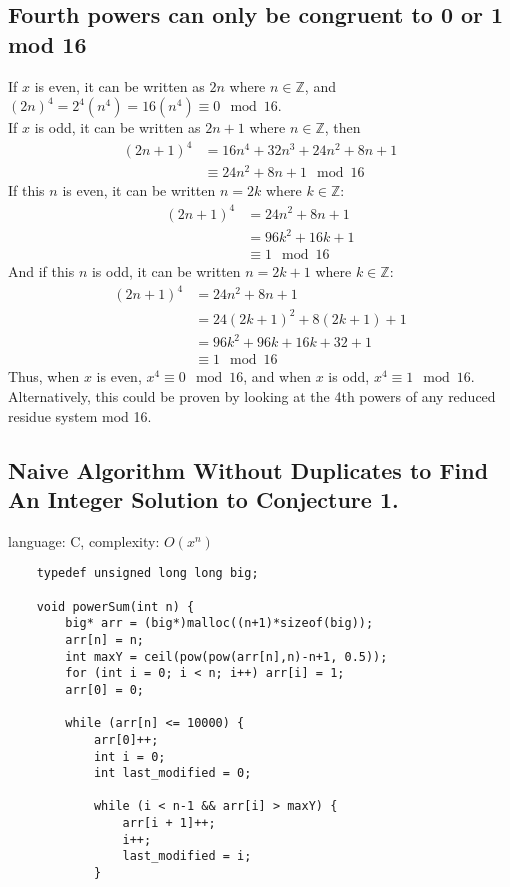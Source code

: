 \documentclass{article}
\begin{document}
\begin{flushleft}
\subsection{Fourth powers can only be congruent to 0 or 1 mod 16}
If $x$ is even, it can be written as $2n$ where $n \in \mathbb{Z}$, and $(2n)^4=2^4(n^4)=16(n^4) \equiv 0 \mod 16$. \\
If $x$ is odd, it can be written as $2n+1$ where $n \in \mathbb{Z}$, then 
\begin{align*}
    (2n+1)^4 &= 16n^4 + 32n^3 + 24n^2 + 8n + 1 \\
    &\equiv 24n^2+8n+1 \mod 16
\end{align*}
If this $n$ is even, it can be written $n=2k$ where $k \in \mathbb{Z}$:
\begin{align*}
    (2n+1)^4 &= 24n^2+8n+1 \\
    &= 96k^2 + 16k + 1 \\
    &\equiv 1 \mod 16
\end{align*}
And if this $n$ is odd, it can be written  $n=2k+1$ where $k \in \mathbb{Z}$: 
\begin{align*}
    (2n+1)^4 &= 24n^2 + 8n + 1 \\
    &= 24(2k+1)^2 + 8(2k+1) + 1 \\
    &= 96k^2 + 96k + 16k + 32 + 1\\
    &\equiv 1 \mod 16
\end{align*}
Thus, when $x$ is even, $x^4 \equiv 0 \mod 16$, and when $x$ is odd, $x^4 \equiv 1 \mod 16$. \\
Alternatively, this could be proven by looking at the 4th powers of any reduced residue system mod 16. 

\subsection{Naive Algorithm Without Duplicates to Find An Integer Solution to Conjecture 1.}
language: C, complexity: $O(x^n)$
\begin{lstlisting}
    typedef unsigned long long big;

    void powerSum(int n) {
        big* arr = (big*)malloc((n+1)*sizeof(big));
        arr[n] = n;
        int maxY = ceil(pow(pow(arr[n],n)-n+1, 0.5));
        for (int i = 0; i < n; i++) arr[i] = 1;
        arr[0] = 0;

        while (arr[n] <= 10000) {
            arr[0]++;
            int i = 0;
            int last_modified = 0;

            while (i < n-1 && arr[i] > maxY) {
                arr[i + 1]++;
                i++;
                last_modified = i;
            }
    

\end{lstlisting}
\end{flushleft}
\end{document}
